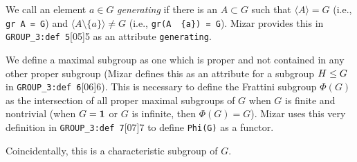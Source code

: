 We call an element $a\in G$ \emph{generating} if there is an $A\subset G$
such that $\langle A\rangle = G$ (i.e., \texttt{gr A = G}) and
$\langle A\setminus\{a\}\rangle\neq G$ (i.e., \texttt{gr(A \ \{a\}) = G}).
Mizar provides this in \verb#GROUP_3:def 5#[05]{5} as
an attribute \verb#generating#.

We define a maximal subgroup as one which is proper and not contained in
any other proper subgroup (Mizar defines this as an attribute for a
subgroup $H\leq G$ in \verb#GROUP_3:def 6#[06]{6}).
This is necessary to define the Frattini subgroup $\Phi(G)$ as the
intersection of all proper maximal subgroups of $G$ when $G$ is finite
and nontrivial (when $G=\mathbf{1}$ or $G$ is infinite, then
$\Phi(G)=G$). Mizar uses this very definition in
\verb#GROUP_3:def 7#[07]{7} to define \texttt{Phi(G)}
as a functor.

Coincidentally, this is a characteristic subgroup of $G$.
